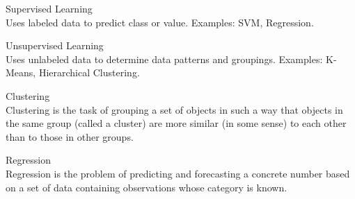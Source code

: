 \begin{concept}{Supervised Learning}\\
Uses labeled data to predict class or value. Examples: SVM, Regression.
\end{concept}

\begin{concept}{Unsupervised Learning}\\
Uses unlabeled data to determine data patterns and groupings. Examples: K-Means, Hierarchical Clustering.
\end{concept}

\begin{definition}{Clustering}\\
Clustering is the task of grouping a set of objects in such a way that objects in the same group (called a cluster) are more similar (in some sense) to each other than to those in other groups.
\end{definition}

\begin{definition}{Regression}\\
Regression is the problem of predicting and forecasting a concrete number based on a set of data containing observations whose category is known.
\end{definition}




